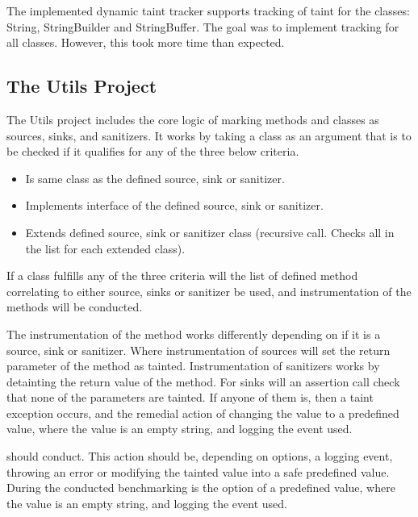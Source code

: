 The implemented dynamic taint tracker supports tracking of taint for the classes: String, StringBuilder and StringBuffer. The goal was to implement tracking for all classes. However, this took more time than expected.



\subsection{The Utils Project}
The Utils project includes the core logic of marking methods and classes as sources, sinks, and sanitizers. It works by taking a class as an argument that is to be checked if it qualifies for any of the three below criteria.

\hfill
\begin{itemize}
    \item Is same class as the defined source, sink or sanitizer.
    \item Implements interface of the defined source, sink or sanitizer.
    \item Extends defined source, sink or sanitizer class (recursive call. Checks all in the list for each extended class). 
\end{itemize}
\hfill

If a class fulfills any of the three criteria will the list of defined method correlating to either source, sinks or sanitizer be used, and instrumentation of the methods will be conducted.

The instrumentation of the method works differently depending on if it is a source, sink or sanitizer. Where instrumentation of sources will set the return parameter of the method as tainted. Instrumentation of sanitizers works by detainting the return value of the method. For sinks will an assertion call check that none of the parameters are tainted. If anyone of them is, then a taint exception occurs, and the remedial action of changing the value to a predefined value, where the value is an empty string, and logging the event used.

should conduct. This action should be, depending on options, a logging event, throwing an error or modifying the tainted value into a safe predefined value. During the conducted benchmarking is the option of a predefined value, where the value is an empty string, and logging the event used.



